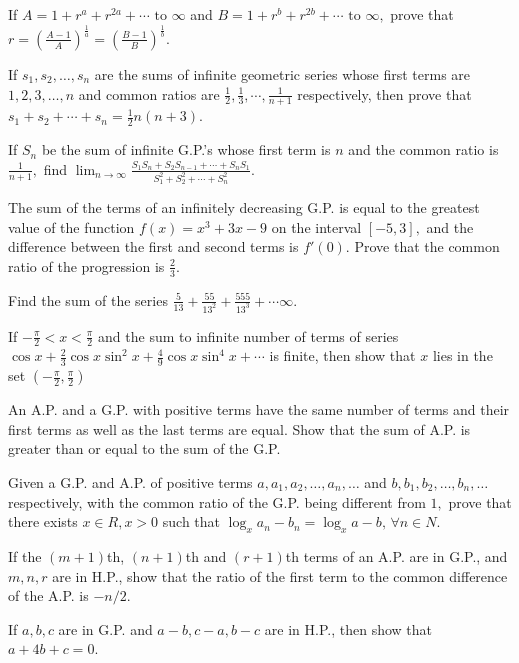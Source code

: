 \item If $A = 1 + r^a + r^{2a} + \cdots \text{~to~}\infty$ and $B = 1 + r^b + r^{2b} + \cdots \text{~to~}\infty,$ prove
  that $r = \left(\frac{A - 1}{A}\right)^{\tfrac{1}{a}} = \left(\frac{B - 1}{B}\right)^{\tfrac{1}{b}}$.
\item If $s_1, s_2, \ldots, s_n$ are the sums of infinite geometric series whose first terms are $1, 2, 3, \ldots, n$ and
  common ratios are $\frac{1}{2}, \frac{1}{3}, \cdots, \frac{1}{n + 1}$ respectively, then prove that $s_1 + s_2 + \cdots + s_n =
  \frac{1}{2}n(n + 3)$.
\item If $S_n$ be the sum of infinite G.P.'s whose first term is $n$ and the common ratio is $\frac{1}{n + 1},$ find
  $\displaystyle\lim_{n\to \infty} \frac{S_1S_n + S_2S_{n - 1} + \cdots + S_nS_1}{S_1^2 + S_2^2 + \cdots + S_n^2}$.
\item The sum of the terms of an infinitely decreasing G.P. is equal to the greatest value of the function $f(x) = x^3 +
  3x - 9$ on the interval $[-5, 3],$ and the difference between the first and second terms is $f'(0).$ Prove that the common ratio
  of the progression is $\frac{2}{3}$.
\item Find the sum of the series $\frac{5}{13} + \frac{55}{13^2} + \frac{555}{13^3} + \cdots \infty$.
\item If $-\frac{\pi}{2} < x < \frac{\pi}{2}$ and the sum to infinite number of terms of series $\cos x + \frac{2}{3}\cos
  x\sin^2x + \frac{4}{9}\cos x\sin^4x + \cdots$ is finite, then show that $x$ lies in the set $\left(-\frac{\pi}{2},
  \frac{\pi}{2}\right)$
\item An A.P. and a G.P. with positive terms have the same number of terms and their first terms as well as the last
  terms are equal. Show that the sum of A.P. is greater than or equal to the sum of the G.P.
\item Given a G.P. and A.P. of positive terms $a, a_1, a_2, \ldots, a_n, \ldots$ and $b, b_1, b_2, \ldots, b_n, \ldots$
  respectively, with the common ratio of the G.P. being different from $1,$ prove that there exists $x\in R, x > 0$ such that
  $\log_x a_n - b_n = \log_x a - b,\,\forall n\in N$.
\item If the $(m + 1)$th, $(n + 1)$th and $(r + 1)$th terms of an A.P. are in G.P., and $m, n, r$ are in H.P., show that
  the ratio of the first term to the common difference of the A.P. is $-n/2$.
\item If $a, b, c$ are in G.P. and $a - b, c - a, b - c$ are in H.P., then show that $a + 4b + c = 0$.
